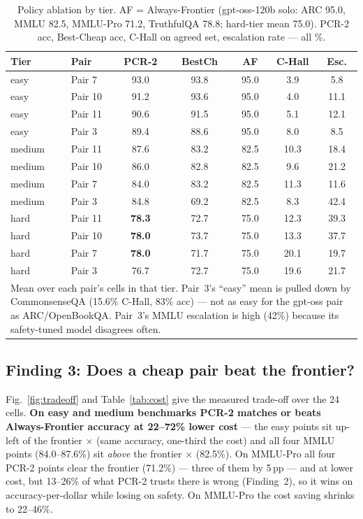 \documentclass[conference]{IEEEtran}
\begin{document}
\begin{table}[!t]
\caption{Policy ablation by tier. AF = Always-Frontier (gpt-oss-120b solo: ARC
95.0, MMLU 82.5, MMLU-Pro 71.2, TruthfulQA 78.8; hard-tier mean 75.0). PCR-2 acc,
Best-Cheap acc, C-Hall on agreed set, escalation rate --- all \%.}
\label{tab:policytier}
\renewcommand{\arraystretch}{1.2}
\begin{tabular}{l l c c c c c}
\toprule
\textbf{Tier} & \textbf{Pair} & \textbf{PCR-2} & \textbf{BestCh} & \textbf{AF} & \textbf{C-Hall} & \textbf{Esc.} \\
\midrule
easy & Pair 7 & 93.0 & 93.8 & 95.0 & 3.9 & 5.8 \\
easy & Pair 10 & 91.2 & 93.6 & 95.0 & 4.0 & 11.1 \\
easy & Pair 11 & 90.6 & 91.5 & 95.0 & 5.1 & 12.1 \\
easy & Pair 3 & 89.4 & 88.6 & 95.0 & 8.0 & 8.5 \\
medium & Pair 11 & 87.6 & 83.2 & 82.5 & 10.3 & 18.4 \\
medium & Pair 10 & 86.0 & 82.8 & 82.5 & 9.6 & 21.2 \\
medium & Pair 7 & 84.0 & 83.2 & 82.5 & 11.3 & 11.6 \\
medium & Pair 3 & 84.8 & 69.2 & 82.5 & 8.3 & 42.4 \\
hard & Pair 11 & \textbf{78.3} & 72.7 & 75.0 & 12.3 & 39.3 \\
hard & Pair 10 & \textbf{78.0} & 73.7 & 75.0 & 13.3 & 37.7 \\
hard & Pair 7 & \textbf{78.0} & 71.7 & 75.0 & 20.1 & 19.7 \\
hard & Pair 3 & 76.7 & 72.7 & 75.0 & 19.6 & 21.7 \\
\bottomrule
\multicolumn{7}{p{8.4cm}}{\footnotesize Mean over each pair's cells in that tier. Pair~3's ``easy'' mean is pulled down by CommonsenseQA (15.6\% C-Hall, 83\% acc) --- not as easy for the gpt-oss pair as ARC/OpenBookQA. Pair~3's MMLU escalation is high (42\%) because its safety-tuned model disagrees often.}
\end{tabular}
\end{table}

\subsection{Finding 3: Does a cheap pair beat the frontier?}
Fig.~\ref{fig:tradeoff} and Table~\ref{tab:cost} give the measured trade-off
over the 24 cells. \textbf{On easy and medium benchmarks PCR-2 matches or beats
Always-Frontier accuracy at 22--72\% lower cost} --- the easy points sit up-left
of the frontier $\times$ (same accuracy, one-third the cost) and all four MMLU
points (84.0--87.6\%) sit \textit{above} the frontier $\times$ (82.5\%). On
MMLU-Pro all four PCR-2 points clear the frontier (71.2\%) --- three of them by
5\,pp --- and at lower cost, but 13--26\% of what PCR-2 trusts there is wrong
(Finding~2), so it wins on accuracy-per-dollar while losing on safety. On
MMLU-Pro the cost saving shrinks to 22--46\%.
\end{document}
